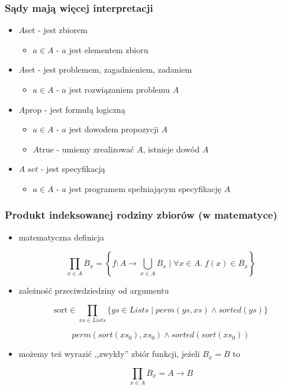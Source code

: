 \documentclass{beamer}
\begin{document}
\begin{frame}
\frametitle{Sądy mają więcej interpretacji}

\begin{itemize}
 \item $A$\;set -  jest zbiorem
\begin{itemize}
 \item $a \in A$ - $a$ jest elementem zbioru
\end{itemize}
 \item $A$\;set -  jest problemem, zagadnieniem, zadaniem
\begin{itemize}
 \item $a \in A$ - $a$ jest rozwiązaniem problemu $A$
\end{itemize}
 \item $A$\;prop - jest formułą logiczną
\begin{itemize}
 \item $a \in A$ - $a$ jest dowodem propozycji $A$
 \item $A$\;true - umiemy zrealizować $A$, istnieje dowód $A$
\end{itemize}
 \item $A\;set$  - jest specyfikacją 
\begin{itemize}
 \item $a \in A$ - $a$ jest programem spełniającym specyfikację $A$
\end{itemize}
\end{itemize}

\end{frame}



\begin{frame}
\frametitle{Produkt indeksowanej rodziny zbiorów (w matematyce)} 

\begin{itemize}

 \item matematyczna definicja


\[ \prod_{x \in A} B_x = \left\{ f : A \to \bigcup_{x \in A} B_x \mid \forall x \in A.\;f(x) \in B_x\right\}  \]

 \item zależność przeciwdziedziny od argumentu

\[ \mbox{sort} \in \prod_{xs \in Lists} \{ ys \in Lists \mid perm(ys, xs) \wedge sorted(ys) \}  \]

\[ perm(sort(xs_0), xs_0) \wedge sorted(sort(xs_0)) \]

 \item możemy też wyrazić ,,zwykły'' zbiór funkcji, jeżeli $B_x = B$ to

\[ \prod_{x \in A} B_x = A \to B \]

\end{itemize}


\end{frame}
\end{document}
